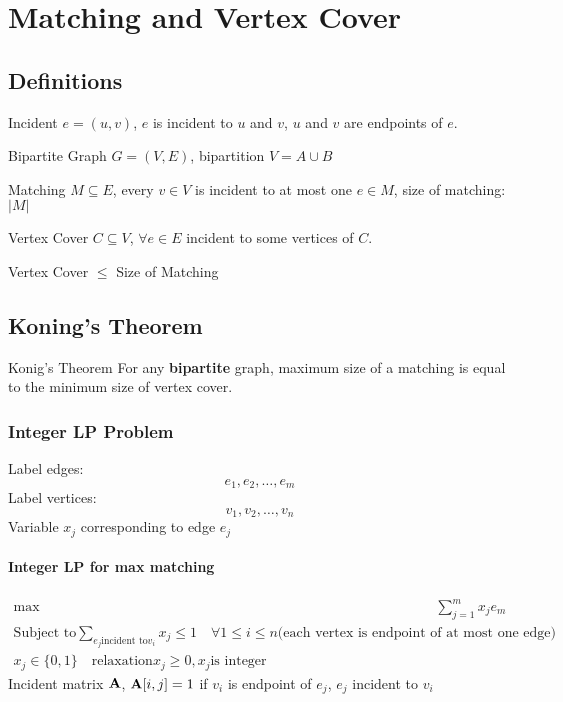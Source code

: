 \section{Matching and Vertex Cover}
\subsection{Definitions}
\begin{definition}{Incident}
$ e = (u,v)$, $e$ is incident to $u$ and $v$, $u$ and
    $v$ are endpoints of $e$.
\end{definition}

\begin{definition}{Bipartite}
Graph $G = (V,E)$, bipartition $ V = A\cup B$
\end{definition}

\begin{definition}{Matching}
$M\subseteq E$, every $v \in V$ is incident to at most
    one $e\in M$, size of matching: $|M|$
\end{definition}

\begin{definition}{Vertex Cover}
 $C\subseteq V$, $\forall e \in E$ incident to some
    vertices of $C$.
\end{definition}

Vertex Cover $\leq$ Size of Matching

\subsection{Koning's Theorem}
\begin{thm}{Konig's Theorem} For any \textbf{bipartite} graph, maximum
    size of a matching is equal to the minimum size of vertex cover.
\end{thm}

\subsubsection{Integer LP Problem}
Label edges: \[e_1, e_2, \dots, e_m\]
Label vertices: \[ v_1, v_2, \dots, v_n\]
Variable $x_j$ corresponding to edge $e_j$

\paragraph{Integer LP for max matching}
\begin{align*}
    \text{max}\quad & \sum_{j=1}^m x_j e_m \\
    \text{Subject to} \sum_{e_j \text{incident to} v_i} x_j \leq 1 \quad
    \forall 1 \leq i \leq n \text{(each vertex is endpoint of at most one
    edge)}\\
    x_j \in \{0,1\} \quad \text{relaxation} x_j \geq 0, x_j \text{is
    integer}
\end{align*}
Incident matrix $\mathbf{A}$, $\mathbf{A}[i,j] = 1$ if $v_i$ is endpoint of $e_j$, $e_j$
incident to $v_i$

